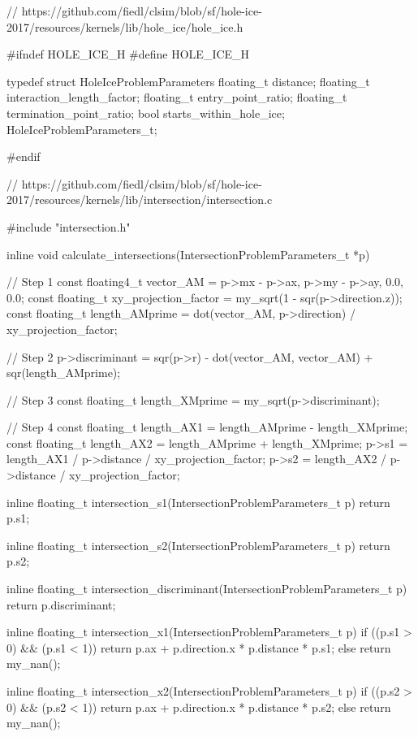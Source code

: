 \begin{ccode}
// https://github.com/fiedl/clsim/blob/sf/hole-ice-2017/resources/kernels/lib/hole_ice/hole_ice.h

#ifndef HOLE_ICE_H
#define HOLE_ICE_H

typedef struct HoleIceProblemParameters {
  floating_t distance;
  floating_t interaction_length_factor;
  floating_t entry_point_ratio;
  floating_t termination_point_ratio;
  bool starts_within_hole_ice;
} HoleIceProblemParameters_t;

#endif
\end{ccode}

\begin{ccode}
// https://github.com/fiedl/clsim/blob/sf/hole-ice-2017/resources/kernels/lib/intersection/intersection.c

#include "intersection.h"

inline void calculate_intersections(IntersectionProblemParameters_t *p)
{
  // Step 1
  const floating4_t vector_AM = {p->mx - p->ax, p->my - p->ay, 0.0, 0.0};
  const floating_t xy_projection_factor = my_sqrt(1 - sqr(p->direction.z));
  const floating_t length_AMprime = dot(vector_AM, p->direction) / xy_projection_factor;

  // Step 2
  p->discriminant = sqr(p->r) - dot(vector_AM, vector_AM) + sqr(length_AMprime);

  // Step 3
  const floating_t length_XMprime = my_sqrt(p->discriminant);

  // Step 4
  const floating_t length_AX1 = length_AMprime - length_XMprime;
  const floating_t length_AX2 = length_AMprime + length_XMprime;
  p->s1 = length_AX1 / p->distance / xy_projection_factor;
  p->s2 = length_AX2 / p->distance / xy_projection_factor;
}

inline floating_t intersection_s1(IntersectionProblemParameters_t p)
{
  return p.s1;
}

inline floating_t intersection_s2(IntersectionProblemParameters_t p)
{
  return p.s2;
}

inline floating_t intersection_discriminant(IntersectionProblemParameters_t p)
{
  return p.discriminant;
}

inline floating_t intersection_x1(IntersectionProblemParameters_t p)
{
  if ((p.s1 > 0) && (p.s1 < 1))
    return p.ax + p.direction.x * p.distance * p.s1;
  else
    return my_nan();
}

inline floating_t intersection_x2(IntersectionProblemParameters_t p)
{
  if ((p.s2 > 0) && (p.s2 < 1))
    return p.ax + p.direction.x * p.distance * p.s2;
  else
    return my_nan();
}


\end{ccode}
